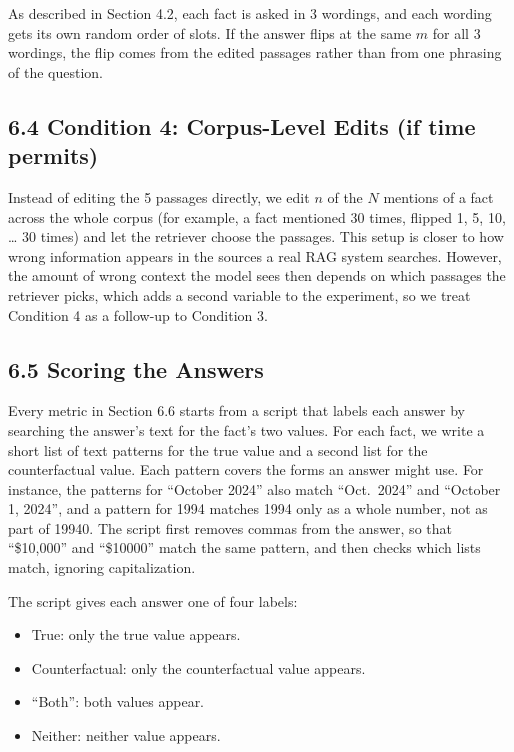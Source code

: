 \documentclass[
  12pt,
  letterpaper,
]{article}
\providecommand{\tightlist}{%
  \setlength{\itemsep}{0pt}\setlength{\parskip}{0pt}}
\begin{document}
As described in Section 4.2, each fact is asked in
3 wordings, and each wording gets its own random
order of slots. If the answer flips at the same
\(m\) for all 3 wordings, the flip comes from the
edited passages rather than from one phrasing of
the question.

\subsection{6.4 Condition 4: Corpus-Level Edits
(if time
permits)}\label{condition-4-corpus-level-edits-if-time-permits}

Instead of editing the 5 passages directly, we
edit \(n\) of the \(N\) mentions of a fact across
the whole corpus (for example, a fact mentioned 30
times, flipped 1, 5, 10, \ldots{} 30 times) and
let the retriever choose the passages. This setup
is closer to how wrong information appears in the
sources a real RAG system searches. However, the
amount of wrong context the model sees then
depends on which passages the retriever picks,
which adds a second variable to the experiment, so
we treat Condition 4 as a follow-up to Condition
3.

\subsection{6.5 Scoring the
Answers}\label{scoring-the-answers}

Every metric in Section 6.6 starts from a script
that labels each answer by searching the answer's
text for the fact's two values. For each fact, we
write a short list of text patterns for the true
value and a second list for the counterfactual
value. Each pattern covers the forms an answer
might use. For instance, the patterns for
``October 2024'' also match ``Oct.~2024'' and
``October 1, 2024'', and a pattern for 1994
matches 1994 only as a whole number, not as part
of 19940. The script first removes commas from the
answer, so that ``\$10,000'' and ``\$10000'' match
the same pattern, and then checks which lists
match, ignoring capitalization.

The script gives each answer one of four labels:

\begin{itemize}
\tightlist
\item
  True: only the true value appears.
\item
  Counterfactual: only the counterfactual value
  appears.
\item
  ``Both'': both values appear.
\item
  Neither: neither value appears.
\end{itemize}
\end{document}
